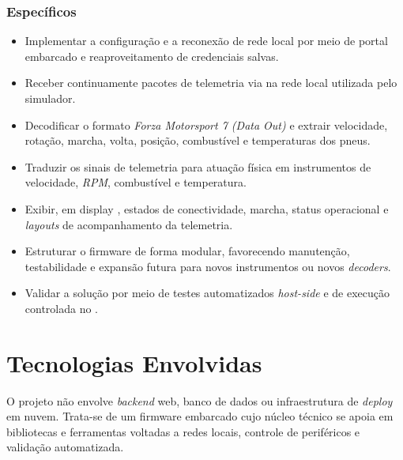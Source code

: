 \documentclass[12pt,oneside,a4paper]{article}
\renewcommand{\texttt}[1]{\begingroup\ttfamily\seqsplit{#1}\endgroup}
\begin{document}
\subsubsection{Específicos}
\begin{itemize}
  \item Implementar a configuração e a reconexão de rede local por meio de
  portal \texttt{Wi-Fi} embarcado e reaproveitamento de credenciais salvas.
  \item Receber continuamente pacotes de telemetria via \texttt{UDP} na rede
  local utilizada pelo simulador.
  \item Decodificar o formato \textit{Forza Motorsport 7 (Data Out)} e extrair
  velocidade, rotação, marcha, volta, posição, combustível e temperaturas dos
  pneus.
  \item Traduzir os sinais de telemetria para atuação física em instrumentos de
  velocidade, \textit{RPM}, combustível e temperatura.
  \item Exibir, em display \texttt{TFT}, estados de conectividade, marcha,
  status operacional e \textit{layouts} de acompanhamento da telemetria.
  \item Estruturar o firmware de forma modular, favorecendo manutenção,
  testabilidade e expansão futura para novos instrumentos ou novos \textit{decoders}.
  \item Validar a solução por meio de testes automatizados \textit{host-side} e de
  execução controlada no \texttt{ESP32}.
\end{itemize}

\section{Tecnologias Envolvidas}

O projeto não envolve \textit{backend} web, banco de dados ou infraestrutura de
\textit{deploy} em nuvem. Trata-se de um firmware embarcado cujo núcleo técnico
se apoia em bibliotecas e ferramentas voltadas a redes locais, controle de
periféricos e validação automatizada.
\end{document}
